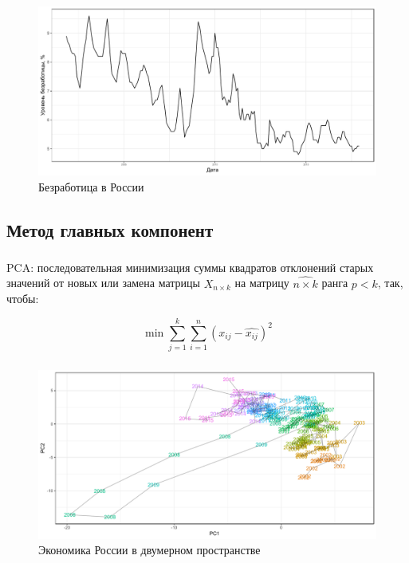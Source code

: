 \documentclass[c, dvipsnames]{beamer}  %
\begin{document}
\begin{frame}
\frametitle{\insertsection} 
\framesubtitle{\insertsubsection}
\begin{figure}
\caption{Безработица в России}
\includegraphics[width=\linewidth]{unemp_level.pdf}
\end{figure}
\end{frame} 

\subsection{Метод главных компонент}
\begin{frame}
\frametitle{\insertsection} 
\framesubtitle{\insertsubsection}
PCA: последовательная минимизация суммы квадратов отклонений старых значений от новых или замена матрицы $X_{n \times k}$ на матрицу $\hat{{n \times k}}$ ранга $p < k$, так, чтобы:

\begin{equation}
    \min \sum_{j = 1}^k \sum_{i = 1}^{n}(x_{ij} - \hat{x_{ij}})^2
\end{equation}

\end{frame}


\begin{frame}
\frametitle{\insertsection} 
\framesubtitle{\insertsubsection}
\begin{figure}
\caption{Экономика России в двумерном пространстве}
\includegraphics[width=\linewidth]{pca.pdf}
\end{figure}
\end{frame}  
\end{document}
